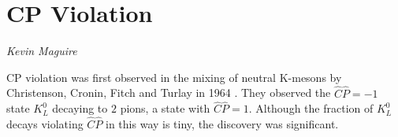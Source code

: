 \section{CP Violation}
\vspace{-1.0em}
\begin{center}
\tiny{\textit{Kevin Maguire}}
\end{center}

CP violation was first observed in the mixing of neutral K-mesons by Christenson, Cronin, Fitch and Turlay in 1964 \cite{FirstCPV}. They observed the $\hat{C}\hat{P} = -1$ state $K^{0}_L$ decaying to $2$ pions, a state with $\hat{C}\hat{P} = 1$. Although the fraction of $K^{0}_L$ decays violating $\hat{C}\hat{P}$ in this way is tiny, the discovery was significant.     
